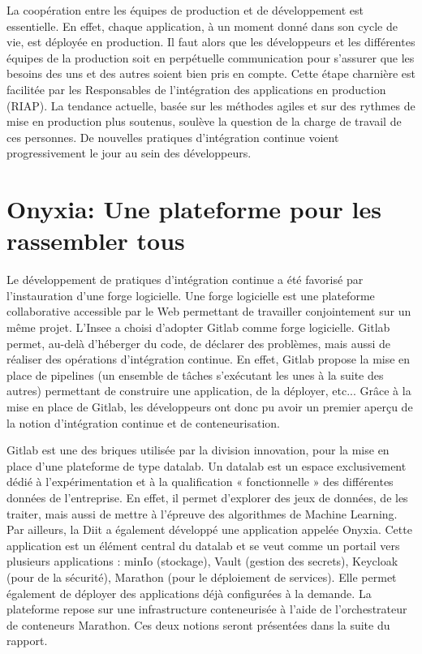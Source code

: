 \documentclass[11pt,fleqn]{book} %
\begin{document}
La coopération entre les équipes de production et de développement est essentielle. En effet, chaque application, à un moment donné dans son cycle de vie, est déployée en production. Il faut alors que les développeurs et les différentes équipes de la production soit en perpétuelle communication pour s'assurer que les besoins des uns et des autres soient bien pris en compte. Cette étape charnière est facilitée par les Responsables de l’intégration des applications en production (RIAP). La tendance actuelle, basée sur les méthodes agiles et sur des rythmes de mise en production plus soutenus,  soulève la question de la charge de travail de ces personnes. De nouvelles pratiques d'intégration continue voient progressivement le jour au sein des développeurs.\newline

\section{Onyxia: Une plateforme pour les rassembler tous}
Le développement de pratiques d'intégration continue a été favorisé par l'instauration d'une forge logicielle. Une forge logicielle est une plateforme collaborative accessible par le Web permettant de travailler conjointement sur un même projet. L'Insee a choisi d'adopter Gitlab comme forge logicielle. Gitlab permet, au-delà d'héberger du code, de déclarer des problèmes, mais aussi de réaliser des opérations d'intégration continue. En effet, Gitlab propose la mise en place de pipelines (un ensemble de tâches s'exécutant les unes à la suite des autres) permettant de construire une application, de la déployer, etc... Grâce à la mise en place de Gitlab, les développeurs ont donc pu avoir un premier aperçu de la notion d'intégration continue et de conteneurisation.\newline

Gitlab est une des briques utilisée par la division innovation, pour la mise en place d'une plateforme de type datalab. Un datalab est un espace exclusivement dédié à l’expérimentation et à la qualification « fonctionnelle » des différentes données de l’entreprise. En effet, il permet d’explorer des jeux de données, de les traiter, mais aussi de mettre à l’épreuve des algorithmes de Machine Learning.\\


Par ailleurs, la Diit a également développé une application appelée Onyxia. Cette application est un élément central du datalab et se veut comme un portail vers plusieurs applications : minIo (stockage), Vault (gestion des secrets), Keycloak (pour de la sécurité), Marathon (pour le déploiement de services). Elle permet également de déployer des applications déjà configurées à la demande. La plateforme repose sur une infrastructure conteneurisée à l'aide de l'orchestrateur de conteneurs Marathon. Ces deux notions seront présentées dans la suite du rapport. 
\end{document}
